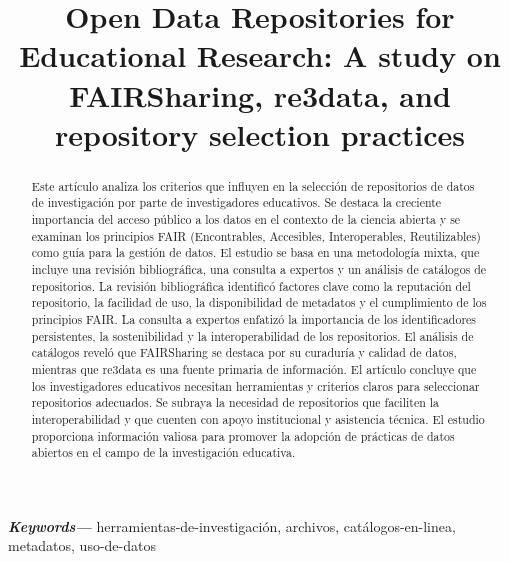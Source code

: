 \documentclass[runningheads]{llncs}
\title{Open Data Repositories for Educational Research: A study on FAIRSharing, re3data, and repository selection practices}
\providecommand{\keywords}[1]
{
  \small	
  \textbf{\textit{Keywords---}} #1
}
\begin{document}
\maketitle

\begin{abstract}
Este artículo analiza los criterios que influyen en la selección de repositorios de datos de investigación por parte de investigadores educativos. Se destaca la creciente importancia del acceso público a los datos en el contexto de la ciencia abierta y se examinan los principios FAIR (Encontrables, Accesibles, Interoperables, Reutilizables) como guía para la gestión de datos. El estudio se basa en una metodología mixta, que incluye una revisión bibliográfica, una consulta a expertos y un análisis de catálogos de repositorios.
La revisión bibliográfica identificó factores clave como la reputación del repositorio, la facilidad de uso, la disponibilidad de metadatos y el cumplimiento de los principios FAIR. La consulta a expertos enfatizó la importancia de los identificadores persistentes, la sostenibilidad y la interoperabilidad de los repositorios. El análisis de catálogos reveló que FAIRSharing se destaca por su curaduría y calidad de datos, mientras que re3data es una fuente primaria de información.
El artículo concluye que los investigadores educativos necesitan herramientas y criterios claros para seleccionar repositorios adecuados. Se subraya la necesidad de repositorios que faciliten la interoperabilidad y que cuenten con apoyo institucional y asistencia técnica. El estudio proporciona información valiosa para promover la adopción de prácticas de datos abiertos en el campo de la investigación educativa.
      
\end{abstract}
\keywords{herramientas-de-investigación, archivos, catálogos-en-linea, metadatos, uso-de-datos}
\end{document}
